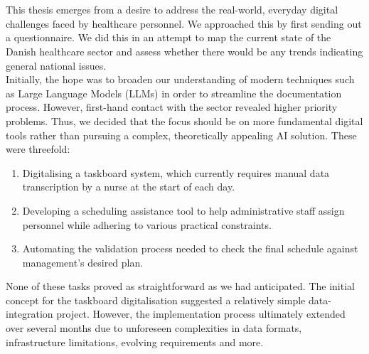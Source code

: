 \\
\\
This thesis emerges from a desire to address the real-world, everyday digital challenges faced by healthcare personnel. We approached this by first sending out a questionnaire. We did this in an attempt to map the current state of the Danish healthcare sector and assess whether there would be any trends indicating general national issues.
\\
Initially, the hope was to broaden our understanding of modern techniques such as Large Language Models (LLMs) in order to streamline the documentation process. However, first-hand contact with the sector revealed higher priority problems. Thus, we decided that the focus should be on more fundamental digital tools rather than pursuing a complex, theoretically appealing AI solution. These were threefold:
\begin{enumerate}
    \item Digitalising a taskboard system, which currently requires manual data transcription by a nurse at the start of each day.
    \item Developing a scheduling assistance tool to help administrative staff assign personnel while adhering to various practical constraints.
    \item Automating the validation process needed to check the final schedule against management's desired plan.
\end{enumerate}
None of these tasks proved as straightforward as we had anticipated. The initial concept for the taskboard digitalisation suggested a relatively simple data-integration project. However, the implementation process ultimately extended over several months due to unforeseen complexities in data formats, infrastructure limitations, evolving requirements and more.

